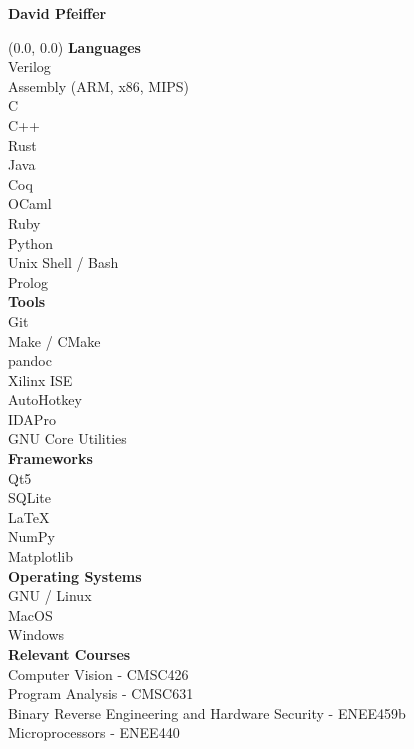 \documentclass[10pt]{article}
\begin{document}

  \begin{center}
    \textbf{\Large David Pfeiffer} \\
  \end{center}

  \begin{textblock}{0.3}(0.0, 0.0)
    \textbf{Languages} \\
    Verilog \\
    Assembly (ARM, x86, MIPS) \\
    C \\
    C++ \\
    Rust \\
    Java \\
    Coq \\
    OCaml \\
    Ruby \\
    Python \\
    Unix Shell / Bash \\
    Prolog \\

    \textbf{Tools} \\
    Git \\
    Make / CMake \\
    pandoc \\
    Xilinx ISE \\
    AutoHotkey \\
    IDAPro \\
    GNU Core Utilities \\

    \textbf{Frameworks} \\
    Qt5 \\
    SQLite \\
    LaTeX \\
    NumPy \\
    Matplotlib \\

    \textbf{Operating Systems} \\
    GNU / Linux \\
    MacOS \\
    Windows \\

    \textbf{Relevant Courses} \\
    Computer Vision - CMSC426 \\
    Program Analysis - CMSC631 \\
    Binary Reverse Engineering and Hardware Security - ENEE459b \\
    Microprocessors - ENEE440 \\


\end{textblock}
\end{document}
